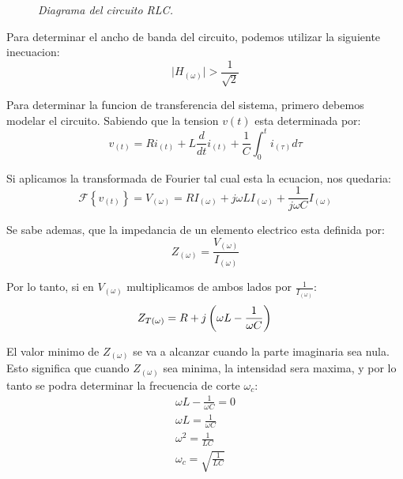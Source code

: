 \documentclass[a4paper,12pt]{report}
\begin{document}
\begin{enumerate}[label=\alph*), left=0pt]
\begin{figure}[h]
                    \textit{Diagrama del circuito RLC.}
                \end{figure}

                Para determinar el ancho de banda del circuito, podemos utilizar la siguiente inecuacion:
                \begin{equation}
                    \label{ancho.de.banda}
                    \lvert H_{(\omega)} \rvert > \frac{1}{\sqrt{2}}
                \end{equation}

                Para determinar la funcion de transferencia del sistema, primero debemos modelar el circuito. Sabiendo
                que la tension $v(t)$ esta determinada por:
                \begin{equation*}
                    v_{(t)} = Ri_{(t)} + L \frac{d}{dt} i_{(t)} + \frac{1}{C} \int_{0}^{t} i_{(\tau)} d\tau
                \end{equation*}

                Si aplicamos la transformada de Fourier tal cual esta la ecuacion, nos quedaria:
                \begin{equation*}
                    \mathcal{F} \left\{ v_{(t)} \right\} = V_{(\omega)} = R I_{(\omega)} + j \omega L I_{(\omega)} +
                        \frac{1}{j \omega C} I_{(\omega)}
                \end{equation*}

                Se sabe ademas, que la impedancia de un elemento electrico esta definida por:
                \begin{equation}
                    \label{impedancia}
                    Z_{(\omega)} = \frac{V_{(\omega)}}{I_{(\omega)}}
                \end{equation}

                Por lo tanto, si en $V_{(\omega)}$ multiplicamos de ambos lados por $\frac{1}{I_{(\omega)}}$:
                \begin{equation*}
                    Z_{T(\omega)} = R + j \left(\omega L - \frac{1}{\omega C}\right)\\
                \end{equation*}

                El valor minimo de $Z_{(\omega)}$ se va a alcanzar cuando la parte imaginaria sea nula. Esto significa
                que cuando $Z_{(\omega)}$ sea minima, la intensidad sera maxima, y por lo tanto se podra determinar la
                frecuencia de corte $\omega_c$:
                \begin{gather*}
                    \omega L - \frac{1}{\omega C} = 0\\
                    \omega L = \frac{1}{\omega C}\\
                    \omega^2 = \frac{1}{LC}\\
                    \omega_c = \sqrt{\frac{1}{LC}}
                \end{gather*}


\end{enumerate}
\end{document}

